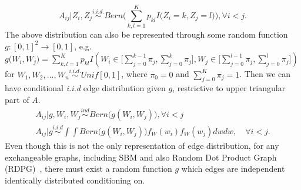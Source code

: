 \documentclass[12pt]{article}
\theoremstyle{definition}
\begin{document}
	\begin{equation} 
	A_{ij} \big| Z_{i}, Z_{j} \overset{i.i.d.}{\sim} Bern\big( \sum\limits_{k,l=1}^{K} p_{kl} I\big( Z_{i} = k, Z_{j} = l  \big)    \big), \forall  i < j.
	\end{equation}
The above distribution can also be represented through some random function $g : [0,1]^2 \rightarrow [0,1]$, e.g.$g\big( W_{i}, W_{j} \big) = \sum\limits_{k,l=1}^{K} p_{kl} I \left( W_{i} \in \big[ \sum\limits_{j=0}^{k-1} \pi_{j}, \sum\limits_{j=0}^{k} \pi_{j}   \big] , W_{j} \in \big[ \sum\limits_{j=0}^{l-1} \pi_{j}, \sum\limits_{j=0}^{l} \pi_{j}  \big]  \right)$ for  $W_{1}, W_{2}, ... , W_{n} \overset{i.i.d.}{\sim} Unif[0,1]$, where $\pi_{0} = 0$ and $\sum\limits_{j=0}^{K}  \pi_{j} = 1$. Then we can have conditional \textit{i.i.d} edge distribution given $g$, restrictive to upper triangular part of $A$.
\begin{equation} 
\begin{gathered}
A_{ij} \big| g, W_{i}, W_{j} \overset{ind}{\sim} Bern \big( g(W_{i}, W_{j})  \big), \forall i < j \\ 
A_{ij} \big| g \overset{i.i.d}{\sim} \int \int Bern \big( g(W_{i}, W_{j}) \big) f_{W}(w_{i}) f_{W}(w_{j}) dw dw, \quad \forall i < j.  
\end{gathered}
\end{equation}
Even though this is not the only representation of edge distribution, for any exchangeable graphs, including SBM and also Random Dot Product Graph (RDPG)~\citep{young2007random}, there must exist a random function $g$ which edges are independent identically distributed conditioning on. 
\end{document}

